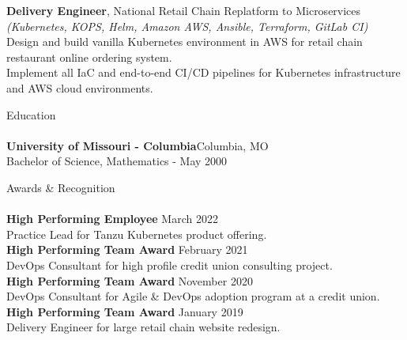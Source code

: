 \documentclass[letterpaper]{article}
\newcommand{\lineunder} {
    \vspace*{-8pt} \\
    \hspace*{-18pt} \hrulefill \\
}
\newcommand{\header} [1] {
    {\hspace*{-18pt}\vspace*{6pt} #1}
    \vspace*{-6pt} \lineunder
}
\begin{document}
{\textbf{Delivery Engineer}, National Retail Chain Replatform to Microservices} \nopagebreak \\
{\sl (Kubernetes, KOPS, Helm, Amazon AWS, Ansible, Terraform, GitLab CI)} \nopagebreak \\
Design and build vanilla Kubernetes environment in AWS for retail chain
  restaurant online ordering system.\\
Implement all IaC and end-to-end CI/CD pipelines for Kubernetes infrastructure
  and AWS cloud environments.\\
\vspace*{2mm}

\header{Education}
\textbf{University of Missouri - Columbia}\hfill Columbia, MO\\
Bachelor of Science, Mathematics \hfill  - May 2000\\
\vspace{2mm}

\header{Awards \& Recognition}

\textbf{High Performing Employee} \hfill March 2022\\
\hspace*{5mm} Practice Lead for Tanzu Kubernetes product offering.\\
\vspace*{2mm}
\textbf{High Performing Team Award} \hfill February 2021\\
\hspace*{5mm} DevOps Consultant for high profile credit union consulting project.\\
\vspace*{2mm}
\textbf{High Performing Team Award} \hfill November 2020\\
\hspace*{5mm} DevOps Consultant for Agile \& DevOps adoption program at a credit union.\\
\vspace*{2mm}
\textbf{High Performing Team Award} \hfill January 2019\\
\hspace*{5mm} Delivery Engineer for large retail chain website redesign.\\
\vspace*{2mm}
\end{document}
